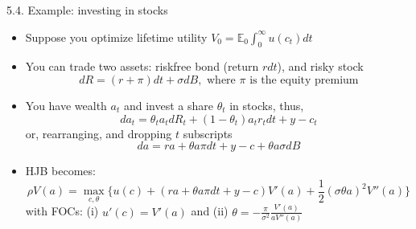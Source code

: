 \documentclass[10pt]{beamer}
\begin{document}
\begin{frame}{5.4. Example: investing in stocks}
\begin{itemize}
\item Suppose you optimize lifetime utility $V_0 = \mathbb{E}_0 \int_0^\infty u(c_t) dt$

\item You can trade two assets: riskfree bond (return $r dt$), and risky stock 
\begin{equation*}
	dR = (r + \pi) dt + \sigma dB, \text{ where } \pi \text{ is the equity premium}
\end{equation*}

\item You have wealth $a_t$ and invest a share $\theta_t$ in stocks, thus,
\begin{equation*}
	da_t = \theta_t a_t dR_t + (1-\theta_t) a_t r_t dt + y - c_t
\end{equation*}
or, rearranging, and dropping $t$ subscripts
\begin{equation*}
	da = r a + \theta a \pi dt + y - c + \theta a \sigma dB 
\end{equation*}

\item HJB becomes:
\begin{equation*}
	\rho V(a) = \max_{c, \theta} \Big\{ u(c) + (  r a + \theta a \pi dt + y - c  ) V'(a) + \frac{1}{2} (\sigma \theta a)^2 V''(a) \Big\}
\end{equation*}
with FOCs: (i) $u'(c) = V'(a)$ and (ii) $\theta = -\frac{\pi}{\sigma^2} \frac{ V'(a) }{a V''(a)}$
\end{itemize}
\end{frame}
\end{document}
